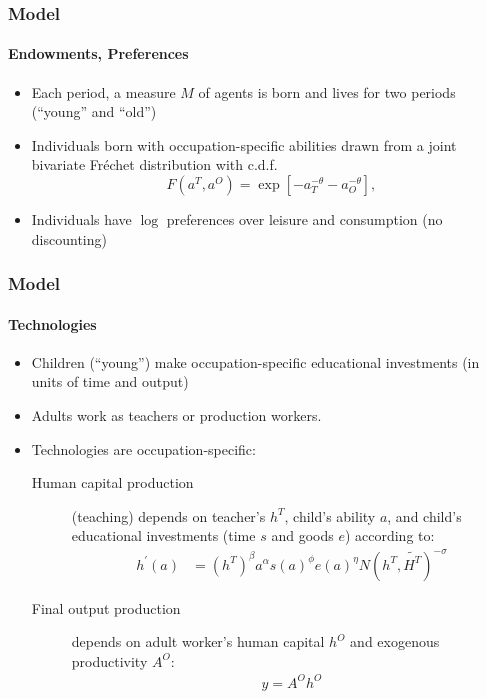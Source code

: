 \documentclass[11pt]{beamer}
\begin{document}
\begin{frame}
\frametitle{Model}
\framesubtitle{Endowments, Preferences}
\begin{itemize}
  \item Each period, a measure $M$ of agents is born and lives for two periods (``young'' and ``old'')
  \item Individuals born with occupation-specific abilities drawn from a joint bivariate Fr\'echet distribution with c.d.f.
  \begin{equation*}
\label{ }
F(a^T,a^O) = \exp \left[ - a_T^{-\theta} - a_O^{-\theta} \right],
\end{equation*}
  \item Individuals have $\log$ preferences over leisure and consumption (no discounting)
\end{itemize}
\end{frame}

\begin{frame}
\frametitle{Model}
\framesubtitle{Technologies}
\begin{itemize}
  \item Children (``young'') make occupation-specific educational investments (in units of time and output)
  \item Adults work as \alert{teachers} or \alert{production workers}.
  \item Technologies are occupation-specific:
  \begin{description}
  \item[Human capital production] (teaching) depends on teacher's $h^T$, child's ability $a$, and child's educational investments (time $s$ and goods $e$) according to:
  \begin{align*}
\label{}
h^{'}(a) & = \left( h^T\right)^\beta a^\alpha s\left(a\right)^\phi e(a)^\eta {N(h^T,\widetilde{H^T})}^{-\sigma}
\end{align*}
  \item[Final output production] depends on adult worker's human capital $h^O$ and exogenous productivity $A^O$:
    \begin{align*}
\label{}
y = A^O h^O
\end{align*}
\end{description}
\end{itemize}
\end{frame}
\end{document}
